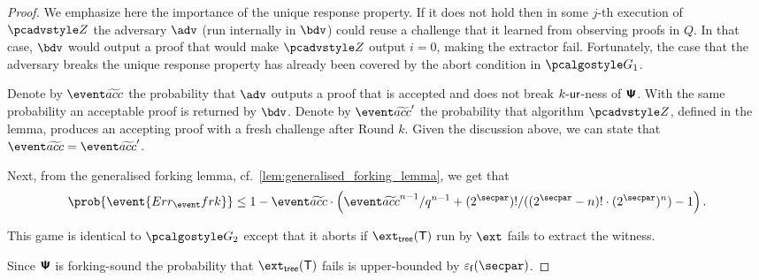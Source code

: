 \begin{proof}
		We emphasize here the importance of the unique response property. If it does not hold then in
		some $j$-th execution of $\zdv$ the adversary $\adv$ (run internally in $\bdv$) could reuse a
		challenge that it learned from observing proofs in $Q$. In that case, $\bdv$ would output a
		proof that would make $\zdv$ output $i = 0$, making the extractor fail. Fortunately, the case
		that the adversary breaks the unique response property has already been covered by the abort
		condition in $\game{1}$.
		
		Denote by $\waccProb$ the probability that $\advse$ outputs a proof that is accepted and does
		not break ${k\text{-}\mathsf{ur}}$-ness of $\bm{\mathsf{\Psi}}$. With the same probability an acceptable proof is returned by
		$\bdv$. Denote by $\waccProb'$ the probability that algorithm $\zdv$, defined in the lemma,
		produces an accepting proof with a fresh challenge after Round $k$. Given the discussion above,
		we can state that $\waccProb = \waccProb'$.
		
		Next, from the generalised forking lemma, cf.~\cref{lem:generalised_forking_lemma}, we get that
		\begin{equation}
		\begin{split}
		\prob{\event{\errfrk}} \leq 1 - \waccProb \cdot \left(\infrac{\waccProb^{n -
				1}}{q^{n - 1}} + \infrac{(2^\secpar) !}{((2^\secpar - n)! \cdot
			(2^\secpar)^{n})} - 1\right).
		\end{split}
		\end{equation}
	
		This game is identical to $\game{2}$ except that it aborts if
		$\extt(\tree)$ run by $\ext$ fails to extract the witness. 
	
		Since $\bm{\mathsf{\Psi}}$ is forking-sound the probability that $\extt(\tree)$
		fails is upper-bounded by $\epsss(\secpar)$.
		

\end{proof}
